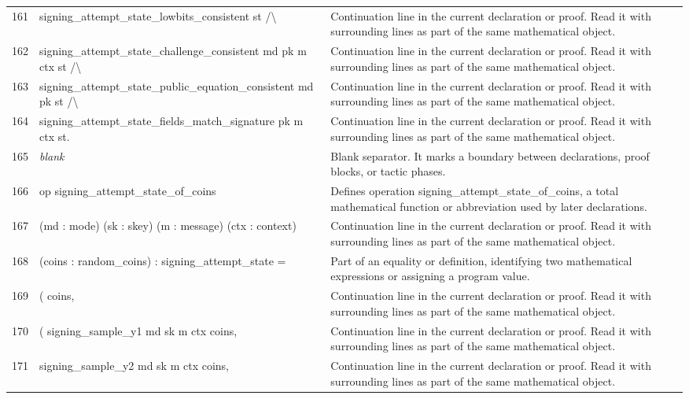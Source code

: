 \documentclass[10pt]{article}
\begin{document}
\begin{longtable}{r L{0.53\textwidth} L{0.37\textwidth}}
161 & {\ttfamily\scriptsize   signing\_attempt\_state\_lowbits\_consistent st /\textbackslash{}} & Continuation line in the current declaration or proof.  Read it with surrounding lines as part of the same mathematical object. \\
162 & {\ttfamily\scriptsize   signing\_attempt\_state\_challenge\_consistent md pk m ctx st /\textbackslash{}} & Continuation line in the current declaration or proof.  Read it with surrounding lines as part of the same mathematical object. \\
163 & {\ttfamily\scriptsize   signing\_attempt\_state\_public\_equation\_consistent md pk st /\textbackslash{}} & Continuation line in the current declaration or proof.  Read it with surrounding lines as part of the same mathematical object. \\
164 & {\ttfamily\scriptsize   signing\_attempt\_state\_fields\_match\_signature pk m ctx st.} & Continuation line in the current declaration or proof.  Read it with surrounding lines as part of the same mathematical object. \\
165 & {\ttfamily\scriptsize \emph{blank}} & Blank separator.  It marks a boundary between declarations, proof blocks, or tactic phases. \\
166 & {\ttfamily\scriptsize op signing\_attempt\_state\_of\_coins} & Defines operation signing\_attempt\_state\_of\_coins, a total mathematical function or abbreviation used by later declarations. \\
167 & {\ttfamily\scriptsize    (md : mode) (sk : skey) (m : message) (ctx : context)} & Continuation line in the current declaration or proof.  Read it with surrounding lines as part of the same mathematical object. \\
168 & {\ttfamily\scriptsize    (coins : random\_coins) : signing\_attempt\_state =} & Part of an equality or definition, identifying two mathematical expressions or assigning a program value. \\
169 & {\ttfamily\scriptsize   ( coins,} & Continuation line in the current declaration or proof.  Read it with surrounding lines as part of the same mathematical object. \\
170 & {\ttfamily\scriptsize     ( signing\_sample\_y1 md sk m ctx coins,} & Continuation line in the current declaration or proof.  Read it with surrounding lines as part of the same mathematical object. \\
171 & {\ttfamily\scriptsize       signing\_sample\_y2 md sk m ctx coins,} & Continuation line in the current declaration or proof.  Read it with surrounding lines as part of the same mathematical object. \\

\end{longtable}
\end{document}
